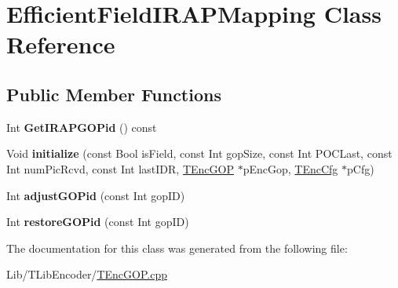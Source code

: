\hypertarget{class_efficient_field_i_r_a_p_mapping}{}\section{Efficient\+Field\+I\+R\+A\+P\+Mapping Class Reference}
\label{class_efficient_field_i_r_a_p_mapping}
\subsection*{Public Member Functions}
\begin{DoxyCompactItemize}
\item 
\mbox{\label{class_efficient_field_i_r_a_p_mapping_adb25ecb5449c6742ac7db401701153f4}} 
Int {\bfseries Get\+I\+R\+A\+P\+G\+O\+Pid} () const
\end{DoxyCompactItemize}
{\bf }\par
\begin{DoxyCompactItemize}
\item 
\mbox{\label{class_efficient_field_i_r_a_p_mapping_a5aa6667d7769a1fb42c83bb06cbfd03b}} 
Void {\bfseries initialize} (const Bool is\+Field, const Int gop\+Size, const Int P\+O\+C\+Last, const Int num\+Pic\+Rcvd, const Int last\+I\+DR, \hyperlink{class_t_enc_g_o_p}{T\+Enc\+G\+OP} $\ast$p\+Enc\+Gop, \hyperlink{class_t_enc_cfg}{T\+Enc\+Cfg} $\ast$p\+Cfg)
\item 
\mbox{\label{class_efficient_field_i_r_a_p_mapping_a271040a7ee80df43d8dd7e15bd55be7d}} 
Int {\bfseries adjust\+G\+O\+Pid} (const Int gop\+ID)
\item 
\mbox{\label{class_efficient_field_i_r_a_p_mapping_a69a2bab4fbf04dbfe912b11430c7be70}} 
Int {\bfseries restore\+G\+O\+Pid} (const Int gop\+ID)
\end{DoxyCompactItemize}



The documentation for this class was generated from the following file\+:\begin{DoxyCompactItemize}
\item 
Lib/\+T\+Lib\+Encoder/\hyperlink{_t_enc_g_o_p_8cpp}{T\+Enc\+G\+O\+P.\+cpp}\end{DoxyCompactItemize}
